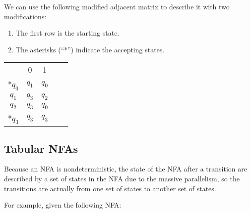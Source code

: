 \documentclass[12pt, letterpaper, oneside]{book}
\begin{document}
We can use the following modified adjacent matrix to describe it with two modifications:
\begin{enumerate}
  \item The first row is the starting state.
  \item The asterisks (``*'') indicate the accepting states.
\end{enumerate}

\begin{table}[H]
  \begin{tabular}{|c|c|c|ll}
    \cline{1-3}
           & 0     & 1     &  & \\ [1ex]   \cline{1-3}
    *$q_0$ & $q_1$ & $q_0$ &  & \\ [0.5ex] \cline{1-3}
    $q_1$  & $q_3$ & $q_2$ &  & \\ [0.5ex] \cline{1-3}
    $q_2$  & $q_3$ & $q_0$ &  & \\ [0.5ex] \cline{1-3}
    *$q_3$ & $q_3$ & $q_3$ &  & \\ [0.5ex] \cline{1-3}
  \end{tabular}
\end{table}

\subsection{Tabular NFAs} \label{automata:tabular-nfas}

Because an NFA is nondeterministic, the state of the NFA after a transition are described by a set of states in the NFA
due to the massive parallelism, so the transitions are actually from one set of states to another set of states.

For example, given the following NFA:

\end{document}
